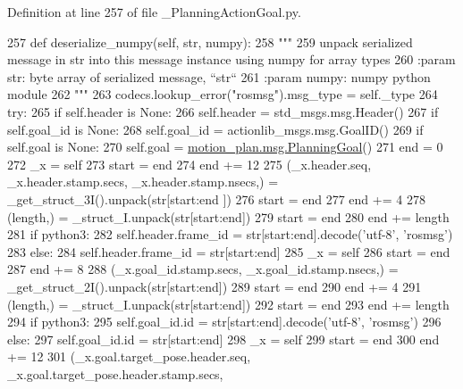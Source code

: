 Definition at line 257 of file \+\_\+\+Planning\+Action\+Goal.\+py.


\begin{DoxyCode}
257   \textcolor{keyword}{def }deserialize\_numpy(self, str, numpy):
258     \textcolor{stringliteral}{"""}
259 \textcolor{stringliteral}{    unpack serialized message in str into this message instance using numpy for array types}
260 \textcolor{stringliteral}{    :param str: byte array of serialized message, ``str``}
261 \textcolor{stringliteral}{    :param numpy: numpy python module}
262 \textcolor{stringliteral}{    """}
263     codecs.lookup\_error(\textcolor{stringliteral}{"rosmsg"}).msg\_type = self.\_type
264     \textcolor{keywordflow}{try}:
265       \textcolor{keywordflow}{if} self.header \textcolor{keywordflow}{is} \textcolor{keywordtype}{None}:
266         self.header = std\_msgs.msg.Header()
267       \textcolor{keywordflow}{if} self.goal\_id \textcolor{keywordflow}{is} \textcolor{keywordtype}{None}:
268         self.goal\_id = actionlib\_msgs.msg.GoalID()
269       \textcolor{keywordflow}{if} self.goal \textcolor{keywordflow}{is} \textcolor{keywordtype}{None}:
270         self.goal = \hyperlink{classmotion__plan_1_1msg_1_1__PlanningGoal_1_1PlanningGoal}{motion\_plan.msg.PlanningGoal}()
271       end = 0
272       \_x = self
273       start = end
274       end += 12
275       (\_x.header.seq, \_x.header.stamp.secs, \_x.header.stamp.nsecs,) = \_get\_struct\_3I().unpack(str[start:end
      ])
276       start = end
277       end += 4
278       (length,) = \_struct\_I.unpack(str[start:end])
279       start = end
280       end += length
281       \textcolor{keywordflow}{if} python3:
282         self.header.frame\_id = str[start:end].decode(\textcolor{stringliteral}{'utf-8'}, \textcolor{stringliteral}{'rosmsg'})
283       \textcolor{keywordflow}{else}:
284         self.header.frame\_id = str[start:end]
285       \_x = self
286       start = end
287       end += 8
288       (\_x.goal\_id.stamp.secs, \_x.goal\_id.stamp.nsecs,) = \_get\_struct\_2I().unpack(str[start:end])
289       start = end
290       end += 4
291       (length,) = \_struct\_I.unpack(str[start:end])
292       start = end
293       end += length
294       \textcolor{keywordflow}{if} python3:
295         self.goal\_id.id = str[start:end].decode(\textcolor{stringliteral}{'utf-8'}, \textcolor{stringliteral}{'rosmsg'})
296       \textcolor{keywordflow}{else}:
297         self.goal\_id.id = str[start:end]
298       \_x = self
299       start = end
300       end += 12
301       (\_x.goal.target\_pose.header.seq, \_x.goal.target\_pose.header.stamp.secs, 

\end{DoxyCode}
